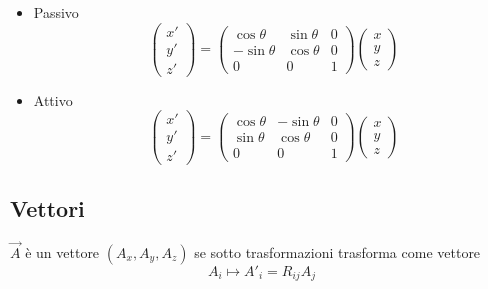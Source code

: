\begin{itemize}
    \item Passivo
    \begin{equation*}
        \begin{pmatrix}
                x' \\
                y' \\
                z'
        \end{pmatrix} =
        \begin{pmatrix}
            \cos\theta & \sin\theta & 0 \\
            -\sin\theta & \cos\theta & 0 \\
            0 & 0 & 1
        \end{pmatrix}
        \begin{pmatrix}
            x \\
            y \\
            z 
        \end{pmatrix}
    \end{equation*}
    \item Attivo
    \begin{equation*}
        \begin{pmatrix}
            x' \\
            y' \\
            z'
        \end{pmatrix} =
        \begin{pmatrix}
            \cos\theta & -\sin\theta & 0 \\
            \sin\theta & \cos\theta & 0 \\
            0 & 0 & 1
        \end{pmatrix}
        \begin{pmatrix}
            x \\
            y \\
            z 
        \end{pmatrix}
    \end{equation*}
\end{itemize}

\subsection*{Vettori}

$\vec{A}$ è un vettore $(A_x,A_y,A_z)$ se sotto trasformazioni trasforma come vettore
\begin{equation*}
    A_i \mapsto A'_i = R_{ij}A_j
\end{equation*}

